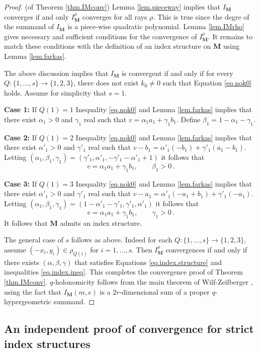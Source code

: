 \documentclass[12pt]{amsart}
\theoremstyle{definition}
\def\a{\alpha}
\def\ga{\gamma}
\def\b{\beta}
\newcommand{\mb}{\mathbf}
\numberwithin{equation}{section}
\begin{document}
\begin{proof}(of Theorem \ref{thm.IMconv})
Lemma \ref{lem.pieceway} implies that $I_{\mb M}$ converges if and only 
$I^{\rho}_{\mb M}$ converges for all rays $\rho$. This is true since
the degre of the summand of $I_{\mb M}$ is a piece-wise quadratic 
polynomial. Lemma \ref{lem.IMrho} gives necessary and sufficient 
conditions for the convergence of $I^{\rho}_{\mb M}$. It remains to match
these conditions with the definition of an index structure on $\mb M$
using Lemma \ref{lem.farkas}.

The above discussion implies that $I_{\mb M}$ is convergent if and only if
for every $Q \colon \{1,\dots,s\}\to\{1,2,3\}$, 
there does not exist $k_0 \neq 0$ such that Equation 
\eqref{eq.nok0} holds. Assume for simplicity that $s=1$. 

{\bf Case 1:} If $Q(1)=1$ Inequality \eqref{eq.nok0}
and Lemma \ref{lem.farkas} implies that there exist $\a_1>0$ and $\ga_1$
real such that $v=\a_1 a_1 + \ga_1 b_1$. Define $\b_1=1-\a_1-\ga_1$.

{\bf Case 2:} If $Q(1)=2$ Inequality \eqref{eq.nok0}
and Lemma \ref{lem.farkas} implies that there exist $\a'_1>0$ and $\ga'_1$
real such that $v-b_1=\a'_1 (-b_1) + \ga'_1(a_1- b_1)$. Letting
$(\a_1,\b_1,\ga_1)=(\ga'_1,\a'_1,-\ga'_1-\a'_1+1) $ it follows that
$$
v=\a_1 a_1 + \ga_1 b_1, \qquad \b_1 > 0 \,.
$$

{\bf Case 3:} If $Q(1)=3$ Inequality \eqref{eq.nok0}
and Lemma \ref{lem.farkas} implies that there exist $\a'_1>0$ and $\ga'_1$
real such that $v-a_1=\a'_1 (-a_1 + b_1) + \ga'_1 (-a_1) $. Letting
$(\a_1,\b_1,\ga_1)=(1-\a'_1-\ga'_1,\ga'_1,\a'_1) $ it follows that
$$
v=\a_1 a_1 + \ga_1 b_1, \qquad \ga_1 > 0 \,.
$$
It follows that $\mb M$ admits an index structure.

The general case of $s$ follows as above. Indeed for each 
$Q: \{1,\dots,s\}\to \{1,2,3\}$, assume $(-x_i,y_i) \in \rho_{Q(i)}$
for $i=1,\dots,s$. Then $I^{\rho}_{\mb M}$ convergences if and only if
there exists $(\a,\b,\ga)$ that satisfies Equations 
\eqref{eq.index.structure} and inequalities \eqref{eq.index.ineq}.
This completes the convergence proof of Theorem \ref{thm.IMconv}.
$q$-holonomi\-city follows from the main theorem of Wilf-Zeilberger 
\cite{WZ}, using the fact that $I_{\mb M}(m,e)$ is a $2r$-dimensional 
sum of a proper $q$-hypergeometric summand.  
\end{proof}

\subsection{An independent proof of convergence for strict index 
structures}
\label{sub.independent.strict}
\end{document}
